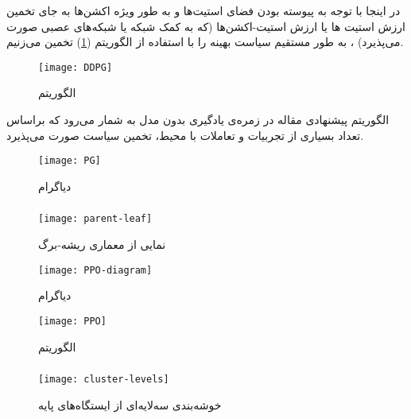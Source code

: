  در اینجا با توجه به پیوسته بودن فضای استیت‌ها و به طور ویژه اکشن‌ها به جای تخمین ارزش استیت ها یا ارزش استیت‌-اکشن‌ها (که به کمک شبکه یا شبکه‌ها‌ی عصبی صورت می‌پذیرد) ، به طور مستقیم سیاست بهینه را با استفاده از الگوریتم (\ref{fig:DDPG}) تخمین می‌زنیم.
 \begin{figure}[ht]
 	\centerline{\texttt{[image: DDPG]}}
 	\caption{الگوریتم }
 	\label{fig:DDPG}
 \end{figure}

الگوریتم پیشنهادی مقاله در زمره‌ی یادگیری بدون مدل به‌ شمار می‌رود که براساس تعداد بسیاری از تجربیات و تعاملات با محیط، تخمین سیاست صورت می‌پذیرد.  
\begin{figure}[ht]
	\centerline{\texttt{[image: PG]}}
	\caption{دیاگرام }
	\label{fig:PG}
\end{figure}



\subsubsection{}


\begin{figure}[ht]
	\centerline{\texttt{[image: parent-leaf]}}
	\caption{نمایی از معماری ریشه-برگ}
	\label{fig:parent-leaf}
\end{figure}

\begin{figure}[ht]
	\centerline{\texttt{[image: PPO-diagram]}}
	\caption{دیاگرام }
	\label{fig:ppod}
\end{figure}

\begin{figure}[ht]
	\centerline{\texttt{[image: PPO]}}
	\caption{الگوریتم }
	\label{fig:ppo}
\end{figure}

\subsubsection{}


\begin{figure}[ht]
	\centerline{\texttt{[image: cluster-levels]}}
	\caption{خوشه‌بندی سه‌لایه‌ای از ایستگاه‌های پایه}
	\label{fig:cluster-levels}
\end{figure}

